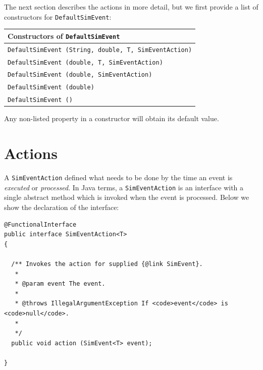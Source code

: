 \documentclass[12pt]{book}
\begin{document}
The next section describes the actions in more detail, but we first provide a list
  of constructors for \lstinline{DefaultSimEvent}:

\begin{tabular}{|l|}
  \hline
  {\bf Constructors of \lstinline|DefaultSimEvent|} \\
  \hline
  \lstinline[basicstyle=\footnotesize]!DefaultSimEvent (String, double, T, SimEventAction)! \\
  \lstinline[basicstyle=\footnotesize]!DefaultSimEvent (double, T, SimEventAction)! \\
  \lstinline[basicstyle=\footnotesize]!DefaultSimEvent (double, SimEventAction)! \\
  \lstinline[basicstyle=\footnotesize]!DefaultSimEvent (double)! \\
  \lstinline[basicstyle=\footnotesize]!DefaultSimEvent ()! \\
  \hline
\end{tabular}

Any non-listed property in a constructor will obtain its default value.

\section{Actions}

A \lstinline{SimEventAction} defined what needs to be done by the time an event
  is {\em executed\/} or {\em processed}.
In Java terms, a \lstinline{SimEventAction} is an interface with
  a single abstract method which is invoked when the event is processed.
Below we show the declaration of the interface:
\begin{lstlisting}[basicstyle=\tiny]
@FunctionalInterface
public interface SimEventAction<T>
{

  /** Invokes the action for supplied {@link SimEvent}.
   *
   * @param event The event.
   *
   * @throws IllegalArgumentException If <code>event</code> is <code>null</code>.
   * 
   */
  public void action (SimEvent<T> event);

}
\end{lstlisting}
\end{document}
